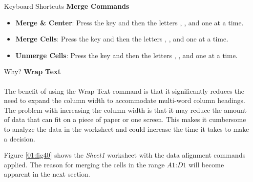 \begin{center}
	\begin{shtcutbox}{Keyboard Shortcuts}
		\textbf{Merge Commands}
		\\
		\begin{itemize}
			\setlength{\itemsep}{0pt}
			\setlength{\parskip}{0pt}
			\setlength{\parsep}{0pt}
			
			\item \textbf{Merge \& Center}: Press the  key and then the letters , , and  one at a time.
			\item \textbf{Merge Cells}: Press the  key and then the letters , , and  one at a time.
			\item \textbf{Unmerge Cells}: Press the  key and then the letters , , and  one at a time.
			
		\end{itemize}
	\end{shtcutbox}
\end{center}

\begin{center}
	\begin{infobox}{Why?}
		\textbf{Wrap Text}
		\\
		\\
		The benefit of using the Wrap Text command is that it significantly reduces the need to expand the column width to accommodate multi-word column headings. The problem with increasing the column width is that it may reduce the amount of data that can fit on a piece of paper or one screen. This makes it cumbersome to analyze the data in the worksheet and could increase the time it takes to make a decision.
	\end{infobox}
\end{center}

Figure \ref{01:fig40} shows the \textit{Sheet1} worksheet with the data alignment commands applied. The reason for merging the cells in the range $ A1 $:$ D1 $ will become apparent in the next section.

